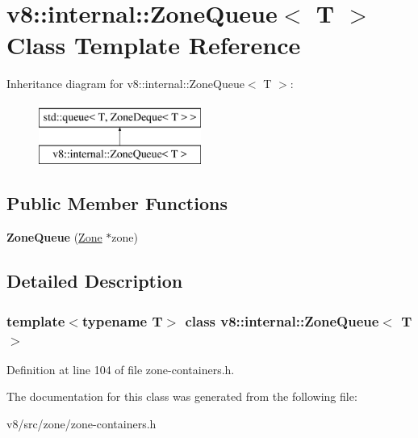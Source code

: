 \hypertarget{classv8_1_1internal_1_1ZoneQueue}{}\section{v8\+:\+:internal\+:\+:Zone\+Queue$<$ T $>$ Class Template Reference}
\label{classv8_1_1internal_1_1ZoneQueue}
Inheritance diagram for v8\+:\+:internal\+:\+:Zone\+Queue$<$ T $>$\+:\begin{figure}[H]
\begin{center}
\leavevmode
\includegraphics[height=2.000000cm]{classv8_1_1internal_1_1ZoneQueue}
\end{center}
\end{figure}
\subsection*{Public Member Functions}
\begin{DoxyCompactItemize}
\item 
\mbox{\label{classv8_1_1internal_1_1ZoneQueue_af8303c6b28e478168cbd7ea65e536bbe}} 
{\bfseries Zone\+Queue} (\mbox{\hyperlink{classv8_1_1internal_1_1Zone}{Zone}} $\ast$zone)
\end{DoxyCompactItemize}


\subsection{Detailed Description}
\subsubsection*{template$<$typename T$>$\newline
class v8\+::internal\+::\+Zone\+Queue$<$ T $>$}



Definition at line 104 of file zone-\/containers.\+h.



The documentation for this class was generated from the following file\+:\begin{DoxyCompactItemize}
\item 
v8/src/zone/zone-\/containers.\+h\end{DoxyCompactItemize}

